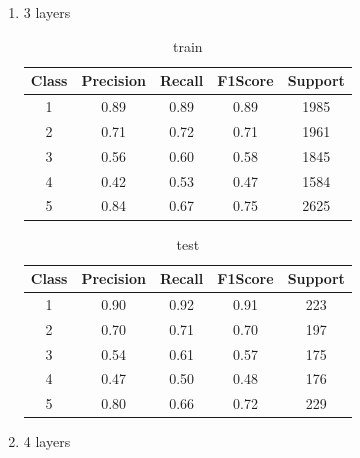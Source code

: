 \begin{enumerate}[label=(\alph*)]
\begin{enumerate}[label=\roman*.]
              \item 3 layers
                    \begin{table}[!htb]
                        \centering
                        \begin{tabular}{ccccc}
                            \hline
                            Class & Precision & Recall & F1Score & Support \\ \hline
                            1     & 0.89      & 0.89   & 0.89    & 1985    \\
                            2     & 0.71      & 0.72   & 0.71    & 1961    \\
                            3     & 0.56      & 0.60   & 0.58    & 1845    \\
                            4     & 0.42      & 0.53   & 0.47    & 1584    \\
                            5     & 0.84      & 0.67   & 0.75    & 2625    \\ \hline
                        \end{tabular}
                        \caption{train}
                        \label{part c train depth 3}
                    \end{table}
                    \begin{table}[!htb]
                        \centering
                        \begin{tabular}{ccccc}
                            \hline
                            Class & Precision & Recall & F1Score & Support \\ \hline
                            1     & 0.90      & 0.92   & 0.91    & 223     \\
                            2     & 0.70      & 0.71   & 0.70    & 197     \\
                            3     & 0.54      & 0.61   & 0.57    & 175     \\
                            4     & 0.47      & 0.50   & 0.48    & 176     \\
                            5     & 0.80      & 0.66   & 0.72    & 229     \\ \hline
                        \end{tabular}
                        \caption{test}
                        \label{part c test depth 3}
                    \end{table}
              \item 4 layers
                    \begin{table}[!htb]

\end{table}
\end{enumerate}
\end{enumerate}
